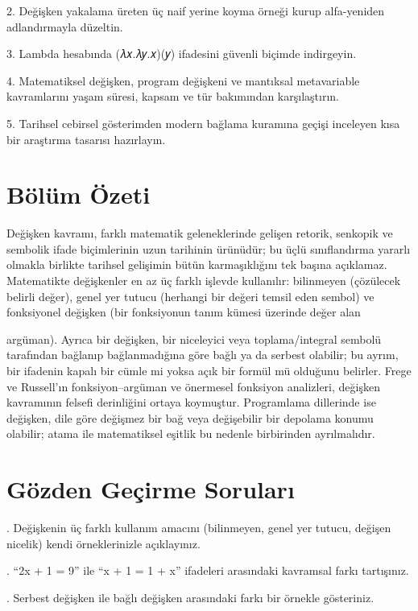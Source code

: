 2. Değişken yakalama üreten üç naif yerine koyma örneği kurup alfa-yeniden adlandırmayla düzeltin.

3. Lambda hesabında (𝜆𝑥.𝜆𝑦.𝑥)(𝑦) ifadesini güvenli biçimde indirgeyin.

4. Matematiksel değişken, program değişkeni ve mantıksal metavariable kavramlarını yaşam süresi, kapsam ve tür bakımından karşılaştırın.

5. Tarihsel cebirsel gösterimden modern bağlama kuramına geçişi inceleyen kısa bir araştırma tasarısı hazırlayın.

\section*{Bölüm Özeti}

Değişken kavramı, farklı matematik geleneklerinde gelişen retorik, senkopik ve sembolik ifade biçimlerinin uzun tarihinin ürünüdür; bu üçlü sınıflandırma yararlı olmakla birlikte tarihsel gelişimin bütün karmaşıklığını tek başına açıklamaz. Matematikte değişkenler en az üç farklı işlevde kullanılır: bilinmeyen (çözülecek belirli değer), genel yer tutucu (herhangi bir değeri temsil eden sembol) ve fonksiyonel değişken (bir fonksiyonun tanım kümesi üzerinde değer alan

argüman). Ayrıca bir değişken, bir niceleyici veya toplama/integral sembolü tarafından bağlanıp bağlanmadığına göre bağlı ya da serbest olabilir; bu ayrım, bir ifadenin kapalı bir cümle mi yoksa açık bir formül mü olduğunu belirler. Frege ve Russell’ın fonksiyon–argüman ve önermesel fonksiyon analizleri, değişken kavramının felsefi derinliğini ortaya koymuştur. Programlama dillerinde ise değişken, dile göre değişmez bir bağ veya değişebilir bir depolama konumu olabilir; atama ile matematiksel eşitlik bu nedenle birbirinden ayrılmalıdır.

\section*{Gözden Geçirme Soruları}

\par{}. Değişkenin üç farklı kullanım amacını (bilinmeyen, genel yer tutucu, değişen nicelik) kendi örneklerinizle açıklayınız.

\par{}. “2x + 1 = 9” ile “x + 1 = 1 + x” ifadeleri arasındaki kavramsal farkı tartışınız.

\par{}. Serbest değişken ile bağlı değişken arasındaki farkı bir örnekle gösteriniz.

